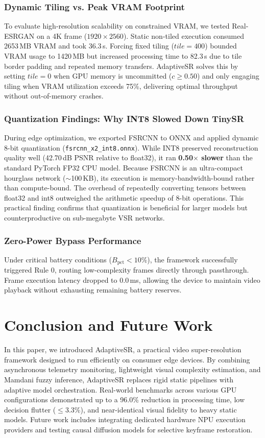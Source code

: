 \documentclass[conference]{IEEEtran}
\begin{document}
\subsubsection{Dynamic Tiling vs. Peak VRAM Footprint}
To evaluate high-resolution scalability on constrained VRAM, we tested Real-ESRGAN on a 4K frame ($1920 \times 2560$). Static non-tiled execution consumed 2653\,MB VRAM and took 36.3\,s. Forcing fixed tiling ($tile=400$) bounded VRAM usage to 1420\,MB but increased processing time to 82.3\,s due to tile border padding and repeated memory transfers. AdaptiveSR solves this by setting $tile=0$ when GPU memory is uncommitted ($c \ge 0.50$) and only engaging tiling when VRAM utilization exceeds 75\%, delivering optimal throughput without out-of-memory crashes.

\subsubsection{Quantization Findings: Why INT8 Slowed Down TinySR}
During edge optimization, we exported FSRCNN to ONNX and applied dynamic 8-bit quantization (\texttt{fsrcnn\_x2\_int8.onnx}). While INT8 preserved reconstruction quality well (42.70\,dB PSNR relative to float32), it ran \textbf{0.50$\times$ slower} than the standard PyTorch FP32 CPU model. Because FSRCNN is an ultra-compact hourglass network ($\sim$100\,KB), its execution is memory-bandwidth-bound rather than compute-bound. The overhead of repeatedly converting tensors between float32 and int8 outweighed the arithmetic speedup of 8-bit operations. This practical finding confirms that quantization is beneficial for larger models but counterproductive on sub-megabyte VSR networks.

\subsubsection{Zero-Power Bypass Performance}
Under critical battery conditions ($B_{\text{pct}} < 10\%$), the framework successfully triggered Rule 0, routing low-complexity frames directly through passthrough. Frame execution latency dropped to $0.0$\,ms, allowing the device to maintain video playback without exhausting remaining battery reserves.

\section{Conclusion and Future Work}
In this paper, we introduced AdaptiveSR, a practical video super-resolution framework designed to run efficiently on consumer edge devices. By combining asynchronous telemetry monitoring, lightweight visual complexity estimation, and Mamdani fuzzy inference, AdaptiveSR replaces rigid static pipelines with adaptive model orchestration. Real-world benchmarks across various GPU configurations demonstrated up to a 96.0\% reduction in processing time, low decision flutter ($\le 3.3\%$), and near-identical visual fidelity to heavy static models. Future work includes integrating dedicated hardware NPU execution providers and testing causal diffusion models for selective keyframe restoration.



\end{document}
